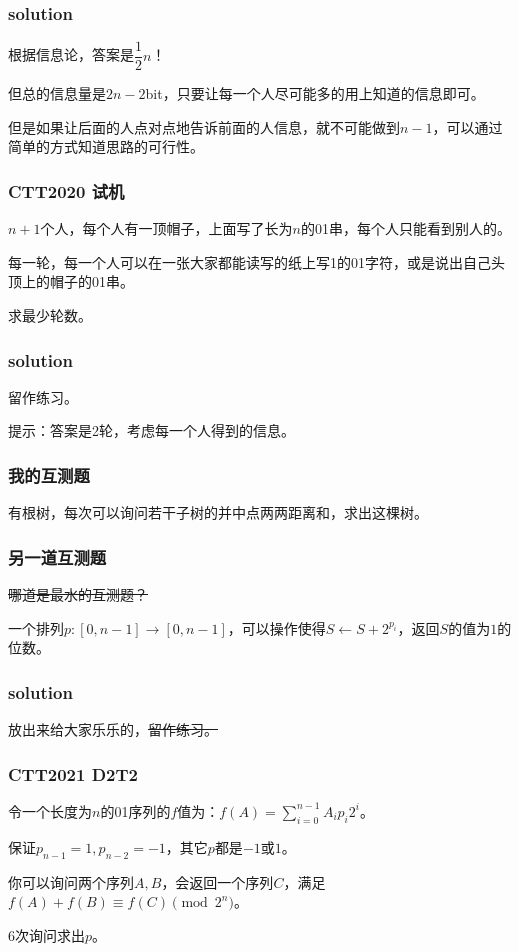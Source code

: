 \documentclass[10pt]{beamer}
\begin{document}
	\clearpage
	\begin{frame}
		\frametitle{solution}
	
		根据信息论，答案是$\dfrac 12n$！


		但总的信息量是$2n-2$bit，只要让每一个人尽可能多的用上知道的信息即可。

		但是如果让后面的人点对点地告诉前面的人信息，就不可能做到$n-1$，可以通过简单的方式知道思路的可行性。
	
	\end{frame}
	\clearpage
	\begin{frame}
		\frametitle{CTT2020 试机}
	
		$n+1$个人，每个人有一顶帽子，上面写了长为$n$的01串，每个人只能看到别人的。

		每一轮，每一个人可以在一张大家都能读写的纸上写1的01字符，或是说出自己头顶上的帽子的01串。

		求最少轮数。
	
	\end{frame}
	\clearpage
	\begin{frame}
		\frametitle{solution}
	
		留作练习。
		
		提示：答案是2轮，考虑每一个人得到的信息。
	
	\end{frame}
	\clearpage
	\begin{frame}
		\frametitle{我的互测题}
	
		有根树，每次可以询问若干子树的并中点两两距离和，求出这棵树。
	
	\end{frame}
	\clearpage
	\begin{frame}
		\frametitle{另一道互测题}
	
		\sout{哪道是最水的互测题？}

		一个排列$p:[0,n-1]\rightarrow[0,n-1]$，可以操作使得$S\leftarrow S+2^{p_i}$，返回$S$的值为$1$的位数。
	
	\end{frame}
	\clearpage
	\begin{frame}
		\frametitle{solution}
	
		放出来给大家乐乐的，\sout{留作练习。}
	
	\end{frame}
	\clearpage
	\begin{frame}
		\frametitle{CTT2021 D2T2}
	
		令一个长度为$n$的01序列的$f$值为：$f(A)=\sum_{i=0}^{n-1}A_ip_i2^i$。

		保证$p_{n-1}=1,p_{n-2}=-1$，其它$p$都是$-1$或$1$。

		你可以询问两个序列$A,B$，会返回一个序列$C$，满足$f(A)+f(B)\equiv f(C) \pmod {2^n}$。

		$6$次询问求出$p$。
	
	\end{frame}
\end{document}
